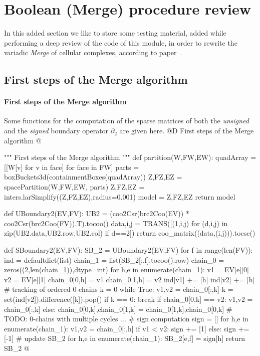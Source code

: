 \documentclass[11pt,oneside]{article}    %
\begin{document}
\section{Boolean (Merge) procedure review}

In this added section we like to store some testing material, added while performing a deep review of the code of this module, in order to rewrite the variadic \emph{Merge} of cellular complexes, according to paper~\cite{2017arXiv170400142P}.

\subsection{First steps of the Merge algorithm}

\paragraph{First steps of the Merge algorithm}
Some functions for the computation of the sparse matrices of both the \emph{unsigned} and the \emph{signed} boundary operator $\partial_2$ are given here.
@D First steps of the Merge algorithm
@{""" First steps of the Merge algorithm """    
def partition(W,FW,EW):
    quadArray = [[W[v] for v in face] for face in FW]
    parts = boxBuckets3d(containmentBoxes(quadArray))
    Z,FZ,EZ = spacePartition(W,FW,EW, parts)
    Z,FZ,EZ = inters.larSimplify((Z,FZ,EZ),radius=0.001)
    model = Z,FZ,EZ
    return model

def UBoundary2(EV,FV):
	UB2 = (coo2Csr(brc2Coo(EV)) * coo2Csr(brc2Coo(FV)).T).tocoo()
	data,i,j = TRANS([(1,i,j) for (d,i,j) in zip(UB2.data,UB2.row,UB2.col) if d==2])
	return coo_matrix((data,(i,j))).tocsc()

def SBoundary2(EV,FV):
	SB_2 = UBoundary2(EV,FV)
	for f in range(len(FV)):
		ind = defaultdict(list)
		chain_1 = list(SB_2[:,f].tocoo().row)
		chain_0 = zeros((2,len(chain_1)),dtype=int)
		for h,e in enumerate(chain_1):
			v1 = EV[e][0]
			v2 = EV[e][1]
			chain_0[0,h] = v1
			chain_0[1,h] = v2
			ind[v1] += [h]
			ind[v2] += [h]
		# tracking of ordered 0-chains
		k = 0
		while True:
			v1,v2 = chain_0[:,k]
			k = set(ind[v2]).difference([k]).pop()
			if k == 0: break
			if chain_0[0,k] == v2:
				v1,v2 = chain_0[:,k]
			else:
				chain_0[0,k],chain_0[1,k] = chain_0[1,k],chain_0[0,k]
		# TODO: 0-chains with multiple cycles ...
		# sign computation
		sign = []
		for h,e in enumerate(chain_1):
			v1,v2 = chain_0[:,h]
			if v1 < v2:
				sign += [1]
			else:
				sign += [-1]
		# update SB_2
		for h,e in enumerate(chain_1):
			SB_2[e,f] = sign[h]
	return SB_2
@}
\end{document}
